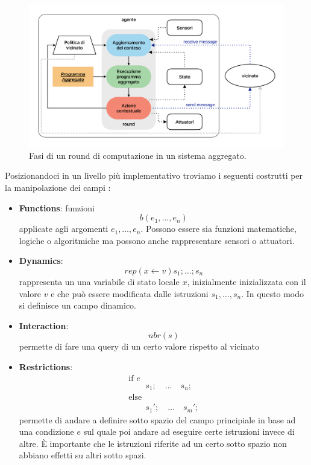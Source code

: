 \documentclass[12pt,a4paper,openright,twoside]{book}
\begin{document}
\begin{figure}
    \centering
    \includegraphics[width=.9\linewidth]{figures/sca-round.pdf}
    \caption{Fasi di un round di computazione in un sistema aggregato.}
    \label{fig:sca-round}
\end{figure}

Posizionandoci in un livello più implementativo troviamo i seguenti costrutti per la manipolazione dei campi \cite{Pianini2017}: 

\begin{itemize}
    \item \textbf{Functions}: funzioni $$ b(e_1,\dots,e_n) $$ applicate agli argomenti $e_1,\dots,e_n$. Possono essere sia funzioni matematiche, logiche o algoritmiche ma possono anche rappresentare sensori o attuatori.
    \item \textbf{Dynamics}: $$ rep(x \leftarrow v){s_1;\dots;s_n} $$ rappresenta un una variabile di stato locale $x$, inizialmente inizializzata con il valore $v$ e che può essere modificata dalle istruzioni $s_1,\dots,s_n$. In questo modo si definisce un campo dinamico.
    \item \textbf{Interaction}: $$ nbr(s) $$ permette di fare una query di un certo valore rispetto al vicinato 
    \item \textbf{Restrictions}: $$
        \begin{array}{l}
        \text{if } e \\
        \qquad s_1; \quad \dots \quad s_n; \\
        \text{else} \\
        \qquad s_1'; \quad \dots \quad s_m';
        \end{array}
    $$
    permette di andare a definire sotto spazio del campo principiale in base ad una condizione $e$ sul quale poi andare ad eseguire certe istruzioni invece di altre. È importante che le istruzioni riferite ad un certo sotto spazio non abbiano effetti su altri sotto spazi.
\end{itemize}
\end{document}

